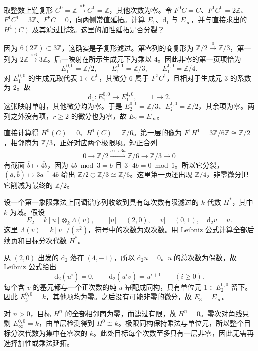\begin{exercise}\label{g2:ex:filtered-six-complex}
	取整数上链复形 \(C^0=\mathbb Z\xrightarrow{\times6}C^1=\mathbb Z\)，其他次数为零。令 \(F^0C=C\)、\(F^1C^0=2\mathbb Z\)、\(F^1C^1=3\mathbb Z\)、\(F^2C=0\)，向两侧常值延拓。计算 \(E_1\)、\(\mathrm d_1\) 与 \(E_\infty\)，并与直接求出的 \(H^1(C)\) 及其滤过比较。这里的加性延拓是否分裂？
\end{exercise}
\begin{solution}
	因为 \(6(2\mathbb Z)\subset3\mathbb Z\)，这确实是子复形滤过。第零列的商复形为 \(\mathbb Z/2\xrightarrow{0}\mathbb Z/3\)，第一列为 \(2\mathbb Z\xrightarrow{\times6}3\mathbb Z\)。后一映射在所示生成元下为乘以 \(4\)。因此非零的第一页项恰为
	\[
		E_1^{0,0}=\mathbb Z/2,\qquad E_1^{0,1}=\mathbb Z/3,\qquad E_1^{1,0}=\mathbb Z/4.
	\]
	对 \(E_1^{0,0}\) 的生成元取代表 \(1\in C^0\)，其微分 \(6\) 属于 \(F^1C^1\)，且相对于生成元 \(3\) 的系数为 \(2\)。故
	\[
		\mathrm d_1:E_1^{0,0}\longrightarrow E_1^{1,0},\qquad \overline1\longmapsto\overline2.
	\]
	这张映射单射，其他微分均为零。于是 \(E_2^{0,1}=\mathbb Z/3\)、\(E_2^{1,0}=\mathbb Z/2\)，其余项为零。两列之外没有项，\(r\ge2\) 的微分也为零，故 \(E_2=E_\infty\)。

	直接计算得 \(H^0(C)=0\)、\(H^1(C)=\mathbb Z/6\)。第一层的像为 \(F^1H^1=3\mathbb Z/6\mathbb Z\cong\mathbb Z/2\)，相邻商为 \(\mathbb Z/3\)，正好对应两个极限项。短正合列
	\[
		0\longrightarrow\mathbb Z/2\xrightarrow{\overline a\mapsto\overline{3a}}\mathbb Z/6\longrightarrow\mathbb Z/3\longrightarrow0
	\]
	有截面 \(\overline b\mapsto\overline{4b}\)，因为 \(4b\bmod3=b\) 且 \(3\cdot4b=0\bmod6\)。所以它分裂，\((\overline a,\overline b)\mapsto\overline{3a+4b}\) 给出 \(\mathbb Z/2\oplus\mathbb Z/3\cong\mathbb Z/6\)。这里第一页还出现 \(\mathbb Z/4\)，非零微分把它削减为最终的 \(\mathbb Z/2\)。
\end{solution}

\begin{exercise}\label{g2:ex:multiplicative-differential-polynomial}
	设一个第一象限乘法上同调谱序列收敛到具有每次数有限滤过的 \(k\) 代数 \(H^*\)，其中 \(k\) 为域。假设
	\[
		E_2=k[u]\otimes_k\Lambda(v),\qquad |u|=(2,0),\quad |v|=(0,1),\quad \mathrm d_2v=u.
	\]
	这里 \(\Lambda(v)=k[v]/(v^2)\)，符号中的次数为双次数。用 Leibniz 公式计算全部后续页和目标分次代数 \(H^*\)。
\end{exercise}
\begin{solution}
	从 \((2,0)\) 出发的 \(\mathrm d_2\) 落在 \((4,-1)\)，所以 \(\mathrm d_2u=0\)。\(u\) 的总次数为偶数，故 Leibniz 公式给出
	\[
		\mathrm d_2(u^i)=0,\qquad \mathrm d_2(u^iv)=u^{i+1}\qquad(i\ge0).
	\]
	每个含 \(v\) 的基元都与一个正次数的纯 \(u\) 幂配成同构，只有单位元 \(1\in E_2^{0,0}\) 留下。因此 \(E_3^{0,0}=k\)，其他项均为零。之后没有可能非零的微分，故 \(E_3=E_\infty\)。

	对 \(n>0\)，目标 \(H^n\) 的全部相邻商为零，而滤过有限，故 \(H^n=0\)。零次对角线只剩 \(E_\infty^{0,0}=k\)，由单层检测得到 \(H^0\cong k\)。极限同构保持乘法与单位元，所以整个目标分次代数为集中在零次的 \(k\)。此处目标每个次数至多只有一层非零，因此无需再选择加性或乘法延拓。
\end{solution}

